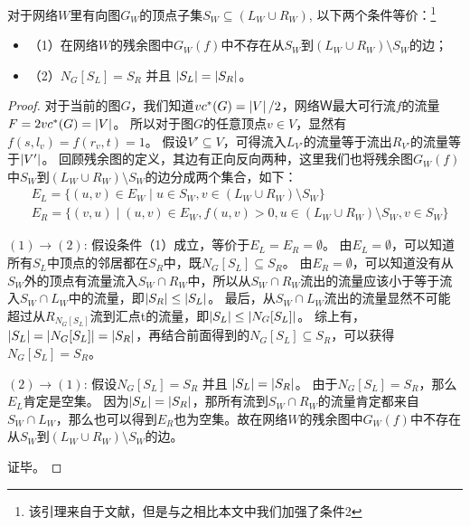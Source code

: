 \begin{lemma}  \label{residualgraph1} 
对于网络$W$里有向图$G_W$的顶点子集$S_W \subseteq (L_W \cup R_W)$, 以下两个条件等价：\footnote{该引理来自于文献\cite{iwata2014linear}，但是与之相比本文中我们加强了条件2}
\begin{itemize}
  \item {（1）}在网络$W$的残余图中$G_W(f)$中不存在从$S_W$到$(L_W \cup R_W) \setminus S_W$的边；
  \item {（2）}$N_G[S_L] = S_R$ 并且 $\left\vert S_L \right\vert = \left\vert S_R \right\vert$。
\end{itemize}
\end{lemma}
\begin{proof}
  对于当前的图$G$，我们知道$vc^*(G) = \left\vert V \right\vert / 2$，网络Ｗ最大可行流$f$的流量$F=2vc^*(G)=\left\vert V \right\vert$。
  所以对于图$G$的任意顶点$v \in V$，显然有$f(s, l_v) = f(r_v, t) = 1$。
  假设$V' \subseteq V$，可得流入$L_{V'}$的流量等于流出$R_{V'}$的流量等于$\left\vert V' \right\vert$。
  回顾残余图的定义，其边有正向反向两种，这里我们也将残余图$G_W(f)$中$S_W$到$(L_W \cup R_W) \setminus S_W$的边分成两个集合，如下：
  \begin{equation*} \begin{aligned}
    & E_L = \{(u, v) \in E_W\;|\;u \in S_W,v \in (L_W \cup R_W) \setminus S_W\} \\
    & E_R = \{(v, u)\;|\;(u, v) \in E_W,f(u, v) > 0,u \in (L_W \cup R_W) \setminus S_W,v \in S_W\}
  \end{aligned} \end{equation*}


  $(1)\rightarrow (2)$: 假设条件（1）成立，等价于$E_L = E_R = \emptyset$。
  由$E_L = \emptyset$，可以知道所有$S_L$中顶点的邻居都在$S_R$中，既$N_G[S_L] \subseteq S_R$。
  由$E_R = \emptyset$，可以知道没有从$S_W$外的顶点有流量流入$S_W \cap R_W$中，所以从$S_W \cap R_W$流出的流量应该小于等于流入$S_W \cap L_W$中的流量，即$\left\vert S_R \right\vert \le \left\vert S_L \right\vert$。
  最后，从$S_W \cap L_W$流出的流量显然不可能超过从$R_{N_G[S_L]}$流到汇点t的流量，即$\left\vert S_L \right\vert \le \left\vert N_G[S_L] \right\vert$。
  综上有，$\left\vert S_L \right\vert = \left\vert N_G[S_L] \right\vert = \left\vert S_R \right\vert$，再结合前面得到的$N_G[S_L] \subseteq S_R$，可以获得$N_G[S_L] = S_R$。

  $(2)\rightarrow (1)$: 假设$N_G[S_L] = S_R$ 并且 $\left\vert S_L \right\vert = \left\vert S_R \right\vert$。
  由于$N_G[S_L] = S_R$，那么$E_L$肯定是空集。
  因为$\left\vert S_L \right\vert = \left\vert S_R \right\vert$，那所有流到$S_W \cap R_W$的流量肯定都来自$S_W \cap L_W$，那么也可以得到$E_R$也为空集。故在网络$W$的残余图中$G_W(f)$中不存在从$S_W$到$(L_W \cup R_W) \setminus S_W$的边。

  证毕。
\end{proof}

